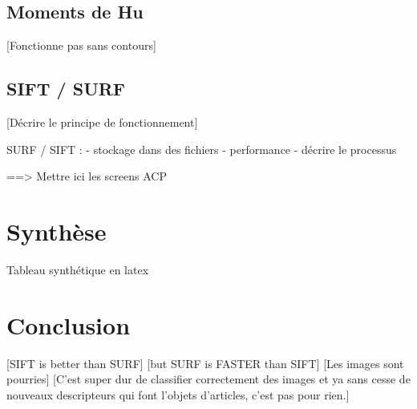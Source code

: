 \documentclass[12pt,a4paper,utf8x]{report}
\begin{document}
    \section{Moments de Hu}
        [Fonctionne pas sans contours]

    \section{SIFT / SURF}
        [Décrire le principe de fonctionnement]

      SURF / SIFT :
      - stockage dans des fichiers
      - performance
      - décrire le processus

==> Mettre ici les screens ACP


\chapter{Synthèse}

Tableau synthétique en latex


\chapter{Conclusion}
    [SIFT is better than SURF]
    [but SURF is FASTER than SIFT]
    [Les images sont pourries]
    [C'est super dur de classifier correctement des images et ya sans cesse de nouveaux descripteurs qui font l'objets d'articles, c'est pas pour rien.]

  
\end{document}
